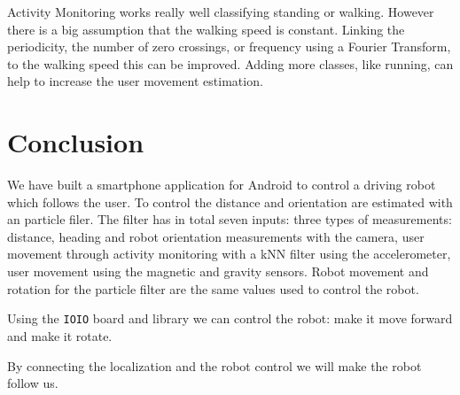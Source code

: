 \documentclass[journal]{IEEEtran}
\begin{document}
Activity Monitoring works really well classifying standing or walking. However
there is a big assumption that the walking speed is constant. Linking the
periodicity, the number of zero crossings, or frequency using a Fourier
Transform, to the walking speed this can be improved. Adding more classes,
like running, can help to increase the user movement estimation.

\section{Conclusion}

We have built a smartphone application for Android to control a driving robot
which follows the user. To control the distance and orientation are estimated
with an particle filer. The filter has in total seven inputs: three types of
measurements: distance, heading and robot orientation measurements with the
camera, user movement through activity monitoring with a kNN filter using
the accelerometer, user movement using the magnetic and gravity sensors. Robot
movement and rotation for the particle filter are the same values used to
control the robot.

Using the \texttt{IOIO} board and library we can control the robot: make it
move forward and make it rotate.

By connecting the localization and the robot control we will make the robot
follow us.




\end{document}
